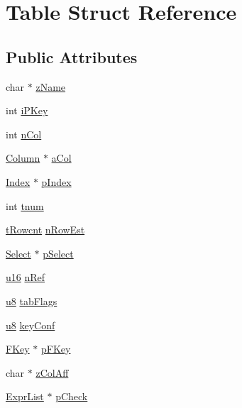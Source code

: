 \hypertarget{struct_table}{\section{Table Struct Reference}
\label{struct_table}
}
\subsection*{Public Attributes}
\begin{DoxyCompactItemize}
\item 
char $\ast$ \hyperlink{struct_table_a20ca62607d6da596b1016b76cf677809}{z\-Name}
\item 
int \hyperlink{struct_table_ab6c8b60da43ccc8a2e2b5b65cc74058f}{i\-P\-Key}
\item 
int \hyperlink{struct_table_a2b3925b85368f0367322ab66bf289163}{n\-Col}
\item 
\hyperlink{struct_column}{Column} $\ast$ \hyperlink{struct_table_a87ec3b706ecf9545bd9ed582a12ce3e7}{a\-Col}
\item 
\hyperlink{struct_index}{Index} $\ast$ \hyperlink{struct_table_a5dffd0c9e8f0265d6a47b32bd0e6d59f}{p\-Index}
\item 
int \hyperlink{struct_table_aebe1abbfb2fd4b5e5dff8e74a4f3c890}{tnum}
\item 
\hyperlink{sqlite3_8c_a6de101211e945e499510b624a65c28a4}{t\-Rowcnt} \hyperlink{struct_table_a909f316fb8c4f86771ae1b5e55c23230}{n\-Row\-Est}
\item 
\hyperlink{struct_select}{Select} $\ast$ \hyperlink{struct_table_a39d620182fe2174fc97d04094421fa60}{p\-Select}
\item 
\hyperlink{sqlite3_8c_a20f2299e322dcbde37cb07b16910b843}{u16} \hyperlink{struct_table_a5c3d59f52186917d412d42e008dd302c}{n\-Ref}
\item 
\hyperlink{sqlite3_8c_a74a0f6424ae628af25f23f0a35f6ead3}{u8} \hyperlink{struct_table_ab0aeb112ae7e1b81e2a18bc493f7992c}{tab\-Flags}
\item 
\hyperlink{sqlite3_8c_a74a0f6424ae628af25f23f0a35f6ead3}{u8} \hyperlink{struct_table_add1b22425db781d976d25b4465a2965a}{key\-Conf}
\item 
\hyperlink{struct_f_key}{F\-Key} $\ast$ \hyperlink{struct_table_a37ccce5ee6d530001d49c82788c6616d}{p\-F\-Key}
\item 
char $\ast$ \hyperlink{struct_table_ac95c0c7b04f2c8367beb98d386d4228f}{z\-Col\-Aff}
\item 
\hyperlink{struct_expr_list}{Expr\-List} $\ast$ \hyperlink{struct_table_a4513ad39c4adad36fdf5dd3c6cb70a12}{p\-Check}

\end{DoxyCompactItemize}
